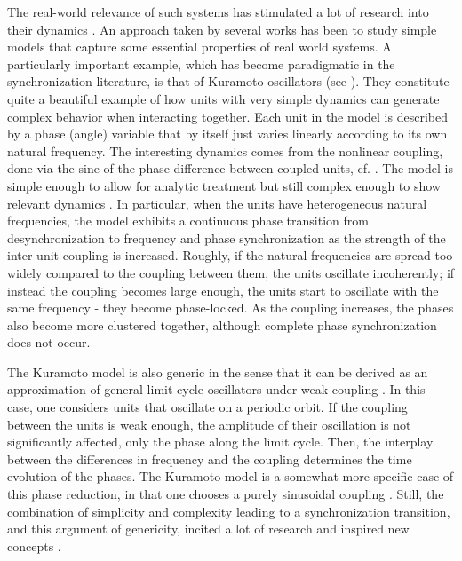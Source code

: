 The real-world relevance of such systems has stimulated a lot of research into their dynamics \cite{feudel2008complex}. An approach taken by several works has been to study simple models that capture some essential properties of real world systems. A particularly important example, which has become paradigmatic in the synchronization literature, is that of Kuramoto oscillators (see ). They constitute quite a beautiful example of how units with very simple dynamics can generate complex behavior when interacting together. Each unit in the model is described by a phase (angle) variable that by itself just varies linearly according to its own natural frequency. The interesting dynamics comes from the nonlinear coupling, done via the sine of the phase difference between coupled units, cf. . The model is simple enough to allow for analytic treatment but still complex enough to show relevant dynamics \cite{strogatz2000from, acebron2005kuramoto}. In particular, when the units have heterogeneous natural frequencies, the model exhibits a continuous phase transition from desynchronization to frequency and phase synchronization as the strength of the inter-unit coupling is increased. Roughly, if the natural frequencies are spread too widely compared to the coupling between them, the units oscillate incoherently; if instead the coupling becomes large enough, the units start to oscillate with the same frequency - they become phase-locked. As the coupling increases, the phases also become more clustered together, although complete phase synchronization does not occur. 

The Kuramoto model is also generic in the sense that it can be derived as an approximation of general limit cycle oscillators under weak coupling \cite{boccaletti2018synchronization}. In this case, one considers units that oscillate on a periodic orbit. If the coupling between the units is weak enough, the amplitude of their oscillation is not significantly affected, only the phase along the limit cycle. Then, the interplay between the differences in frequency and the coupling determines the time evolution of the phases. The Kuramoto model is a somewhat more specific case of this phase reduction, in that one chooses a purely sinusoidal coupling \cite{strogatz2000from}. Still, the combination of simplicity and complexity leading to a synchronization transition, and this argument of genericity, incited a lot of research and inspired new concepts \cite{acebron2005kuramoto, rodrigues2016the, strogatz2000from}.

